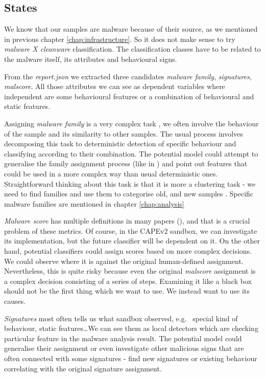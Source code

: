 \subsection{States}
We know that our samples are malware because of their source, as we mentioned in previous chapter \ref{chap:infrastructure}. So it does not make sense to try \emph{malware X cleanware} classification. The classification classes have to be related to the malware itself, its attributes and behavioural signs.

From the \emph{report.json} we extracted three candidates \emph{malware family}, \emph{signatures}, \emph{malscore}. All those attributes we can see as dependent variables where independent are some behavioural features or a combination of behavioural and static features. 

Assigning \emph{malware family} is a very complex task \cite{Gennari2011}, we often involve the behaviour of the sample and its similarity to other samples. The usual process involves decomposing this task to deterministic detection of specific behaviour and classifying according to their combination. The potential model could attempt to generalise the family assignment process (like in \cite{Rieck2008}) and point out features that could be used in a more complex way than usual deterministic ones. Straightforward thinking about this task is that it is more a clustering task - we need to find families and use them to categorise old, and new samples \cite{Pitolli2017}. Specific malware families are mentioned in chapter \ref{chap:analysis}

\emph{Malware score} has multiple definitions in many papers (\cite{Walker2019, Kumar2014}), and that is a crucial problem of these metrics. Of course, in the CAPEv2 sandbox, we can investigate its implementation, but the future classifier will be dependent on it. On the other hand, potential classifiers could assign scores based on more complex decisions. We could observe where it is against the original human-defined assignment. Nevertheless, this is quite risky because even the original \emph{malscore} assignment is a complex decision consisting of a series of steps. Examining it like a black box should not be the first thing which we want to use. We instead want to use its causes.

\emph{Signatures} most often tells us what sandbox observed, e.g. \ special kind of behaviour, static features\dots We can see them as local detectors which are checking particular feature in the malware analysis result. The potential model could generalise their assignment or even investigate other malicious signs that are often connected with some signatures - find new signatures or existing behaviour correlating with the original signature assignment.

